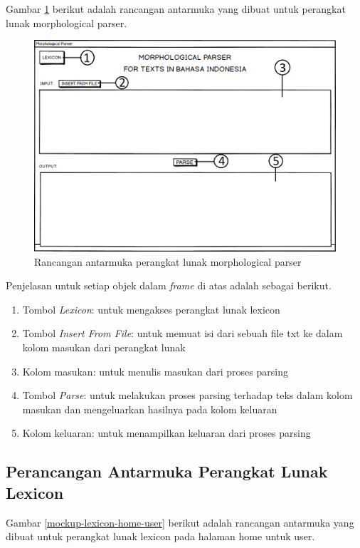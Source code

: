Gambar \ref{mockup-parser} berikut adalah rancangan antarmuka yang dibuat untuk perangkat lunak morphological parser.

\begin{figure}[H]
\centering
\includegraphics[scale=0.7]{Gambar/mockup-parser}
\caption{Rancangan antarmuka perangkat lunak morphological parser} 
\label{mockup-parser}
\end{figure}

Penjelasan untuk setiap objek dalam \textit{frame} di atas adalah sebagai berikut.

\begin{enumerate}
	\item Tombol \textit{Lexicon}: untuk mengakses perangkat lunak lexicon
	\item Tombol \textit{Insert From File}: untuk memuat isi dari sebuah file txt ke dalam kolom masukan dari perangkat lunak
	\item Kolom masukan: untuk menulis masukan dari proses parsing
	\item Tombol \textit{Parse}: untuk melakukan proses parsing terhadap teks dalam kolom masukan dan mengeluarkan hasilnya pada kolom keluaran
	\item Kolom keluaran: untuk menampilkan keluaran dari proses parsing
\end{enumerate}

\subsection{Perancangan Antarmuka Perangkat Lunak Lexicon}
\label{sec:antarmukaLexicon}

Gambar \ref{mockup-lexicon-home-user} berikut adalah rancangan antarmuka yang dibuat untuk perangkat lunak lexicon pada halaman home untuk user.

